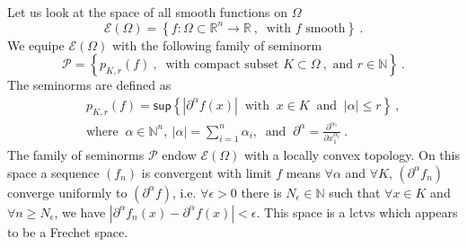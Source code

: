 \documentclass[10pt]{book}
\newcommand{\abs}[1]{\left|#1\right|}
\renewcommand{\sup}{\mathsf{sup}}
\newcommand{\Ecal}{\mathcal{E}}
\newcommand{\Pcal}{\mathcal{P}}
\newcommand{\Nbb}{\mathbb{N}}
\newcommand{\Rbb}{\mathbb{R}}
\theoremstyle{break}
\begin{document}
Let us look at the space of all smooth functions on $\Omega$
%
\begin{equation*}
\Ecal(\Omega) =  \left\{ f : \Omega \subset \Rbb^n \to \Rbb \ , \ \mbox{ with } f \mbox{ smooth}  \right\} \ .
\end{equation*}
%
We equipe $\Ecal(\Omega)$ with the following family of seminorm
%
\begin{equation*}
\Pcal = \left\{ p_{K,r}(f) \ , \ \mbox{ with compact subset } K \subset \Omega \ , \mbox{ and } r \in \Nbb \right\} \ . 
\end{equation*}
%
The seminorms are defined as
%
\begin{eqnarray*}
&& p_{K,r}(f) = \sup \left\{ \abs{\partial^\alpha f(x)} \ \mbox{ with } \ x\in K \ \mbox{ and } \ \abs{\alpha} \leq r  \right\} \ , \\
&& \mbox{where } \ \alpha \in \Nbb^n, \ \abs{\alpha} = \sum_{i=1}^n \alpha_i, \ \mbox{ and } \ \partial^\alpha = \frac{\partial^{\alpha_1}}{\partial x_1^{\alpha_1}} \ .
\end{eqnarray*}
%
The family of seminorms $\Pcal$ endow $\Ecal(\Omega)$ with a locally convex topology.  On this space a sequence $(f_n)$ is convergent with limit $f$ means $\forall \alpha$ and $\forall K$, $(\partial^\alpha f_n)$ converge uniformly to $(\partial^\alpha f)$, i.e. $\forall \epsilon > 0$ there is $N_\epsilon \in \Nbb$ such that $\forall x \in K$ and $\forall n \geq N_\epsilon$, we have $\abs{\partial^\alpha f_n(x) - \partial^\alpha f(x)} < \epsilon$. This space is a lctvs which appears to be a Frechet space.


\bigskip
\end{document}
